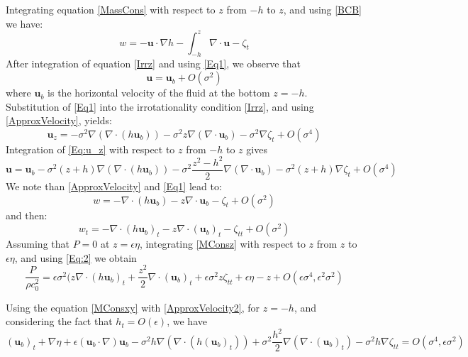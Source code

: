 \documentclass[11pt,a4paper]{article}
\begin{document}
Integrating equation \eqref{MassCons} with respect to $z$ from $-h$ to $z$, and using \eqref{BCB} we have: 
\begin{equation}
w = -\mathbf{u} \cdot \nabla h - \int^z_{-h} \nabla \cdot \mathbf{u} - \zeta_t \label{Eq1}
\end{equation}
After integration of equation \eqref{Irrz} and using \eqref{Eq1}, we observe that
\begin{equation}
\mathbf{u} = \mathbf{u}_b + O(\sigma^2) \label{ApproxVelocity}
\end{equation}
where $\mathbf{u}_b$ is the horizontal velocity of the fluid at the bottom $z=-h$. Substitution of \eqref{Eq1} into the irrotationality condition \eqref{Irrz}, and using \eqref{ApproxVelocity}, yields:
\begin{equation}
\mathbf{u}_z = -\sigma^2\nabla(\nabla \cdot (h \mathbf{u}_b)) - \sigma^2 z \nabla(\nabla \cdot \mathbf{u}_b) - \sigma^2 \nabla \zeta_t + O(\sigma^4) \label{Eq:u_z}
\end{equation}
Integration of \eqref{Eq:u_z} with respect to $z$ from $-h$ to $z$ gives
\begin{equation}
\mathbf{u} = \mathbf{u}_b - \sigma^2(z+h)\nabla (\nabla \cdot (h \mathbf{u}_b)) - \sigma^2 \frac{z^2-h^2}{2}\nabla ( \nabla \cdot \mathbf{u}_b) - \sigma^2(z+h)\nabla \zeta_t + O(\sigma^4) \label{ApproxVelocity2}
\end{equation}
We note than \eqref{ApproxVelocity} and \eqref{Eq1} lead to: 
\begin{equation}
w = - \nabla \cdot (h \mathbf{u}_b) - z \nabla \cdot \mathbf{u}_b - \zeta_t + O(\sigma^2)
\end{equation}
and then:
\begin{equation}
w_t = - \nabla \cdot (h \mathbf{u}_b)_t - z \nabla \cdot (\mathbf{u}_b)_t - \zeta_{tt} + O(\sigma^2) \label{Eq:2} 
\end{equation}
Assuming that $P = 0$ at $z = \epsilon\eta$, integrating \eqref{MConsz} with respect to $z$ from $z$ to $\epsilon\eta$, and using \eqref{Eq:2} we obtain
\begin{equation}
\frac{P}{\rho c_0^2} = \epsilon \sigma^2(z\nabla \cdot (h \mathbf{u}_b)_t + \frac{z^2}{2} \nabla \cdot (\mathbf{u}_b)_t + \epsilon \sigma^2z \zeta_{tt} + \epsilon \eta - z + O(\epsilon\sigma^4, \epsilon^2 \sigma^2)
\end{equation}

Using the equation \eqref{MConsxy} with \eqref{ApproxVelocity2}, for $z = -h$, and considering the fact that $h_t = O(\epsilon)$, we have
\begin{equation}
(\mathbf{u}_b)_t + \nabla \eta + \epsilon (\mathbf{u}_b \cdot \nabla)\mathbf{u}_b - \sigma^2 h \nabla (\nabla \cdot (h (\mathbf{u}_b)_t)) + \sigma^2 \frac{h^2}{2} \nabla (\nabla \cdot (\mathbf{u}_b)_t) - \sigma^2 h \nabla \zeta_{tt} = O(\sigma^4, \epsilon \sigma ^2) \label{Eq:3}
\end{equation}
\end{document}
